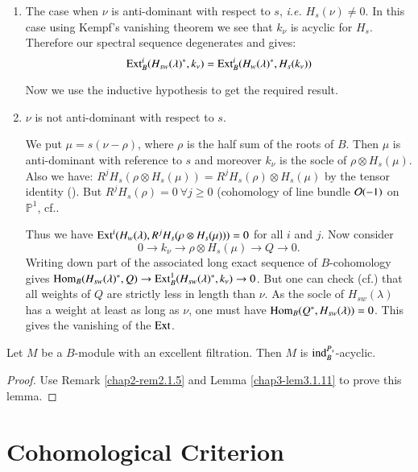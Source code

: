 \begin{enumerate}
\item The case when $\nu$ is anti-dominant with respect to $s$, {\em
  i.e.} $H_{s}(\nu)\neq 0$. In this case using Kempf's vanishing
  theorem we see that $k_{\nu}$ is acyclic for $H_{s}$. Therefore our
  spectral sequence degenerates and gives:
$$
\operatorname{Ext}^{i}_{B}(H_{sw}(\lambda)^{*},k_{\nu})=\operatorname{Ext}^{i}_{B}(H_{w}(\lambda)^{*},H_{s}(k_{\nu})) 
$$

Now we use the inductive hypothesis to get the required result.

\item $\nu$ is not anti-dominant with respect to $s$.

We put $\mu=s(\nu-\rho)$, where $\rho$ is the half sum of the roots of
$B$. Then $\mu$ is anti-dominant with reference to $s$ and moreover
$k_{\nu}$ is the socle of $\rho\otimes H_{s}(\mu)$. Also we have:
$R^{j}H_{s}(\rho\otimes H_{s}(\mu))=R^{j}H_{s}(\rho)\otimes
H_{s}(\mu)$ by the tensor identity (\cite{key11}). But
$R^{j}H_{s}(\rho)=0 \  \forall j\geq 0$ (cohomology of line bundle
$\mathcal{O}(-1)$ on $\mathbb{P}^{1}$, cf.\@ \cite[II 5.2]{key11}.


Thus we have $\operatorname{Ext}^{i}(H_{w}(\lambda), R^{j}H_{s}(\rho\otimes
H_{s}(\mu)))=0$ for all $i$ and $j$. Now consider 
$$
0\to k_{\nu}\to \rho\otimes H_{s}(\mu)\to Q\to 0.
$$
Writing down part of the associated long exact sequence of
$B$-cohomology gives $\operatorname{Hom}_{B}(H_{sw}(\lambda)^{*},Q)\to
\operatorname{Ext}^{1}_{B}(H_{sw}(\lambda)^{*},k_{\nu})\to 0$. But one can check
(cf.\@ \cite[II 5.2]{key11}) that all weights of $Q$ are strictly less
in length than $\nu$. As the socle of $H_{sw}(\lambda)$ has a weight
at least as long as $\nu$, one must have
$\operatorname{Hom}_{B}(Q^{*},H_{sw}(\lambda))=0$. This gives the vanishing of the $\operatorname{Ext}$.
\end{enumerate}

\begin{lemma}\label{chap3-lem3.1.12}
Let $M$ be a $B$-module with an excellent filtration. Then $M$ is
$\operatorname{ind}^{P_{s}}_{B}$-acyclic. 
\end{lemma}

\begin{proof}
Use Remark \ref{chap2-rem2.1.5} and Lemma \ref{chap3-lem3.1.11} to
prove this lemma.
\end{proof}

\section{Cohomological Criterion}\label{chap3-sec3.2}\pageoriginale

